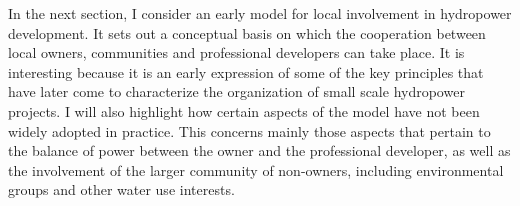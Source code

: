 In the next section, I consider an early model for local involvement in hydropower development. It sets out a conceptual basis on which the cooperation between local owners, communities and professional developers can take place. It is interesting because it is an early expression of some of the key principles that have later come to characterize the organization of small scale hydropower projects. I will also highlight how certain aspects of the model have not been widely adopted in practice. This concerns mainly those aspects that pertain to the balance of power between the owner and the professional developer, as well as the involvement of the larger community of non-owners, including environmental groups and other water use interests.



